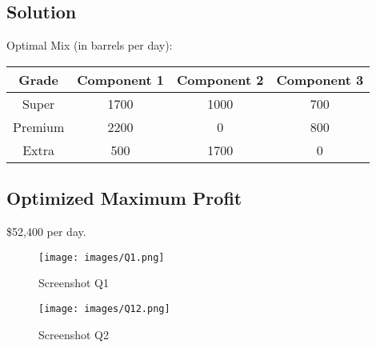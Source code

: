 \documentclass[10pt]{article}
\begin{document}
\subsection*{Solution}
Optimal Mix (in barrels per day):

\begin{tabular}{|c|c|c|c|}
\hline
Grade & Component 1 & Component 2 & Component 3 \\
\hline
Super & 1700 & 1000 & 700 \\
Premium & 2200 & 0 & 800 \\
Extra & 500 & 1700 & 0 \\
\hline
\end{tabular}

\subsection*{Optimized Maximum Profit}
\$52,400 per day.

\begin{figure}[h!]
    \centering
    \begin{minipage}[b]{0.49\textwidth}
        \centering
        \texttt{[image: images/Q1.png]} %
        \caption{Screenshot Q1}
    \end{minipage}
    \hfill
    \begin{minipage}[b]{0.49\textwidth}
        \centering
        \texttt{[image: images/Q12.png]} %
        \caption{Screenshot Q2}
    \end{minipage}
\end{figure}
\end{document}
